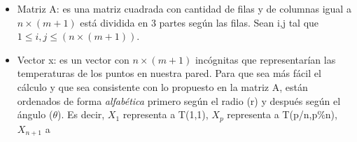 \begin{itemize}
  \item Matriz A: es una matriz cuadrada con cantidad de filas y de columnas igual a $n \times (m+1)$ 
  	está dividida en 3 partes según las filas.  Sean i,j tal que $1 \leq i,j \leq (n \times
	(m+1))$. \\
 \item Vector x: es un vector con $n \times (m+1)$ incógnitas que representarían las temperaturas de los
 puntos en nuestra pared. Para que sea más fácil el cálculo y que sea consistente con lo propuesto
 en la matriz A, están ordenados de forma \textit{alfabética} primero según el radio (r) y después según
 el ángulo ($\theta$). Es decir, $X_1$ representa a T(1,1), $X_p$ representa a T(p/n,p\%n), $X_{n+1}$ a

\end{itemize}
